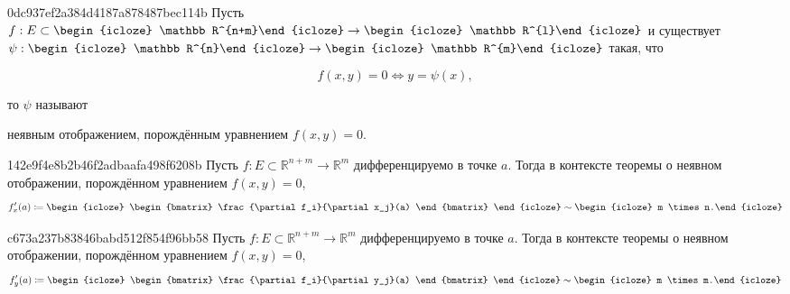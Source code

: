 \begin{note}{0dc937ef2a384d4187a878487bec114b}
    Пусть \({ f : E \subset \begin{icloze}{4}\mathbb R^{n+m}\end{icloze} \to \begin{icloze}{4}\mathbb R^{l}\end{icloze} }\) и существует \({ \psi : \begin{icloze}{3}\mathbb R^{n}\end{icloze} \to \begin{icloze}{3}\mathbb R^{m}\end{icloze} }\) такая, что
    \begin{icloze}{2}
        \[
            f(x, y) = 0 \iff y = \psi(x),
        \]
    \end{icloze}
    то \({ \psi }\) называют \begin{icloze}{1}неявным отображением, порождённым уравнением \({ f(x, y) = 0 }\).\end{icloze}
\end{note}

\begin{note}{142e9f4e8b2b46f2adbaafa498f6208b}
    Пусть \({ f : E \subset \mathbb R^{n + m} \to \mathbb R^{m} }\) дифференцируемо в точке \({ a }\).
    Тогда в контексте теоремы о неявном отображении, порождённом уравнением \({ f(x, y) = 0 }\),
    \[
        f'_{x}(a) \coloneqq
        \begin{icloze}{1}
            \begin{bmatrix}
                \frac{\partial f_i}{\partial x_j}(a)
            \end{bmatrix}
        \end{icloze}
        \sim \begin{icloze}{2}m \times n.\end{icloze}
    \]
\end{note}

\begin{note}{c673a237b83846babd512f854f96bb58}
    Пусть \({ f : E \subset \mathbb R^{n + m} \to \mathbb R^{m} }\) дифференцируемо в точке \({ a }\).
    Тогда в контексте теоремы о неявном отображении, порождённом уравнением \({ f(x, y) = 0 }\),
    \[
        f'_{y}(a) \coloneqq
        \begin{icloze}{1}
            \begin{bmatrix}
                \frac{\partial f_i}{\partial y_j}(a)
            \end{bmatrix}
        \end{icloze}
        \sim \begin{icloze}{2}m \times m.\end{icloze}
    \]
\end{note}

